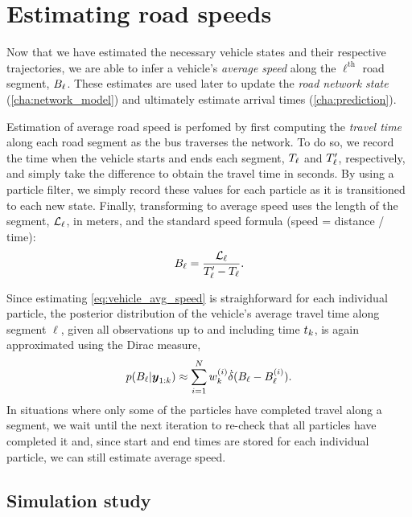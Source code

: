 \section{Estimating road speeds}
\label{sec:vehicle_speeds}

Now that we have estimated the necessary vehicle states and their respective trajectories, we are able to infer a vehicle's \emph{average speed} along the $\ell^\text{th}$ road segment, $B_{\ell}$. These estimates are used later to update the \emph{road network state} (\cref{cha:network_model}) and ultimately estimate arrival times (\cref{cha:prediction}).


Estimation of average road speed is perfomed by first computing the \emph{travel time} along each road segment as the bus traverses the network. To do so, we record the time when the vehicle starts and ends each segment, $T_\ell$ and $T'_\ell$, respectively, and simply take the difference to obtain the travel time in seconds. By using a particle filter, we simply record these values for each particle as it is transitioned to each new state. Finally, transforming to average speed uses the length of the segment, $\mathcal{L}_\ell$, in meters, and the standard speed formula (speed = distance / time):
\begin{equation}
\label{eq:vehicle_avg_speed}
B_\ell = \frac{\mathcal{L}_\ell}{T'_\ell - T_\ell}.
\end{equation}


Since estimating \cref{eq:vehicle_avg_speed} is straighforward for each individual particle, the posterior distribution of the vehicle's average travel time along segment $\ell$, given all observations up to and including time $t_k$, is again approximated using the Dirac measure,
\begin{equation}
\label{eq:pf_speed_dist}
p(B_\ell | \boldsymbol{y}_{1:k}) \approx
\sum_{i=1}^N w^{(i)}_k \dot\delta(B_\ell - B^{(i)}_\ell).
\end{equation}
In situations where only some of the particles have completed travel along a segment, we wait until the next iteration to re-check that all particles have completed it and, since start and end times are stored for each individual particle, we can still estimate average speed.


\subsection{Simulation study}
\label{eq:pf_simulation_study}

